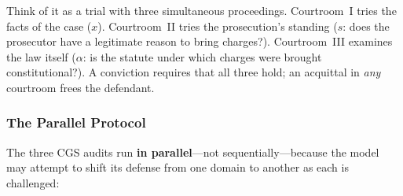 \documentclass[11pt,a4paper]{article}
\theoremstyle{definition}
\theoremstyle{plain}
\theoremstyle{remark}
\begin{document}
Think of it as a trial with three simultaneous proceedings. Courtroom~I tries the facts of the case ($x$). Courtroom~II tries the prosecution's standing ($s$: does the prosecutor have a legitimate reason to bring charges?). Courtroom~III examines the law itself ($\alpha$: is the statute under which charges were brought constitutional?). A conviction requires that all three hold; an acquittal in \emph{any} courtroom frees the defendant.

\subsubsection{The Parallel Protocol}

The three CGS audits run \textbf{in parallel}---not sequentially---because the model may attempt to shift its defense from one domain to another as each is challenged:
\end{document}
